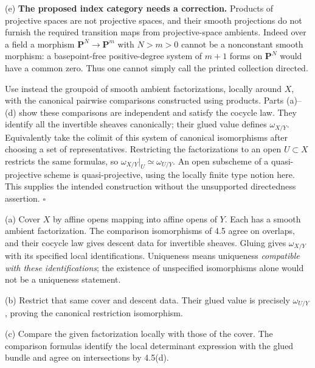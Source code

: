 \documentclass[11pt]{article}
\let\chapterexercise\exercise
\renewcommand{\exercise}[2]{\Needspace{8\baselineskip}\chapterexercise{#1}{#2}}
\begin{document}
(e) \textbf{The proposed index category needs a correction.} Products of projective spaces are not projective spaces, and their smooth projections do not furnish the required transition maps from projective-space ambients. Indeed over a field a morphism $\mathbf P^N\to\mathbf P^m$ with $N>m>0$ cannot be a nonconstant smooth morphism: a basepoint-free positive-degree system of $m+1$ forms on $\mathbf P^N$ would have a common zero. Thus one cannot simply call the printed collection directed.

Use instead the groupoid of smooth ambient factorizations, locally around $X$, with the canonical pairwise comparisons constructed using products. Parts (a)--(d) show these comparisons are independent and satisfy the cocycle law. They identify all the invertible sheaves canonically; their glued value defines $\omega_{X/Y}$. Equivalently take the colimit of this system of canonical isomorphisms after choosing a set of representatives. Restricting the factorizations to an open $U\subset X$ restricts the same formulas, so $\omega_{X/Y}|_U\simeq\omega_{U/Y}$. An open subscheme of a quasi-projective scheme is quasi-projective, using the locally finite type notion here. This supplies the intended construction without the unsupported directedness assertion. \hfill$\square$

\pf
(a) Cover $X$ by affine opens mapping into affine opens of $Y$. Each has a smooth ambient factorization. The comparison isomorphisms of 4.5 agree on overlaps, and their cocycle law gives descent data for invertible sheaves. Gluing gives $\omega_{X/Y}$ with its specified local identifications. Uniqueness means uniqueness \emph{compatible with these identifications}; the existence of unspecified isomorphisms alone would not be a uniqueness statement.

(b) Restrict that same cover and descent data. Their glued value is precisely $\omega_{U/Y}$, proving the canonical restriction isomorphism.

(c) Compare the given factorization locally with those of the cover. The comparison formulas identify the local determinant expression with the glued bundle and agree on intersections by 4.5(d).
\end{document}
